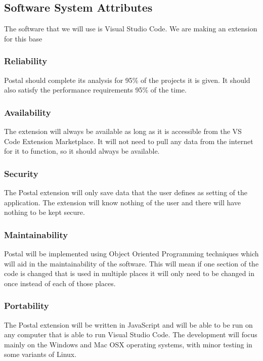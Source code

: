\documentclass[letterpaper,10pt,titlepage,draftclsnofoot,onecolumn,onesided] {IEEEtran}
\begin{document}
\subsection{Software System Attributes}
The software that we will use is Visual Studio Code. We are making an extension for this base

\subsubsection{Reliability}
Postal should complete its analysis for 95\% of the projects it is given. It should also satisfy the performance requirements 95\% of the time.   

\subsubsection{Availability}
The extension will always be available as long as it is accessible from the VS Code Extension Marketplace. 
It will not need to pull any data from the internet for it to function, so it should always be available.

\subsubsection{Security}
The Postal extension will only save data that the user defines as setting of the application. 
The extension will know nothing of the user and there will have nothing to be kept secure.

\subsubsection{Maintainability}
Postal will be implemented using Object Oriented Programming techniques which will aid in the maintainability of the software. 
This will mean if one section of the code is changed that is used in multiple places it will only need to be changed in once instead of each of those places.

\subsubsection{Portability}
The Postal extension will be written in JavaScript and will be able to be run on any computer that is able to run Visual Studio Code. 
The development will focus mainly on the Windows and Mac OSX operating systems, with minor testing in some variants of Linux.
\end{document}
